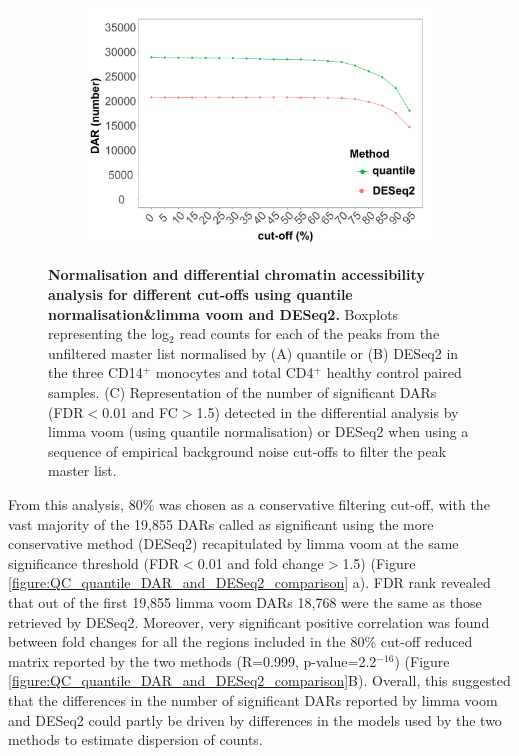 \begin{figure}[htbp]
\begin{subfigure}{0.5\textwidth}
\includegraphics[width=\textwidth]{./Results1/pdfs/ATAC_Core_CD4vsCD14_DOC_FDR_01_vs_cutoffs_quantile_DESeq2_only}
\caption{\textbf{}}
\end{subfigure}

\caption[Normalisation and differential chromatin accessibility analysis for different cut-offs using quantile normalisation limma voom and DESeq2.]{\textbf{Normalisation and differential chromatin accessibility analysis for different cut-offs using quantile normalisation\&limma voom and DESeq2.} Boxplots representing the log$_2$  read counts for each of the peaks from the unfiltered master list normalised by (A) quantile or (B) DESeq2 in the three CD14$^+$ monocytes and total CD4$^+$  healthy control paired samples. (C) Representation of the number of significant DARs (FDR$<$0.01 and FC$>$1.5) detected in the differential analysis by limma voom (using quantile normalisation) or DESeq2 when using a sequence of empirical background noise cut-offs to filter the peak master list.}
\label{figure:ATAC_normalisation_and_DARs_limma_DESeq2}
\end{figure} 


From this analysis, 80\% was chosen as a conservative filtering cut-off, with the vast majority of the 19,855  DARs called as significant using the more conservative method (DESeq2) recapitulated by limma voom at the same significance threshold (FDR$<$0.01 and fold change$>$1.5) (Figure \ref{figure:QC_quantile_DAR_and_DESeq2_comparison} a). FDR rank revealed that out of the first 19,855 limma voom DARs 18,768 were the same as those retrieved by DESeq2. Moreover, very significant positive correlation was found between fold changes for all the regions included in the 80\% cut-off reduced matrix reported by the two methods (R=0.999, p-value=2.2$^{-16}$) (Figure \ref{figure:QC_quantile_DAR_and_DESeq2_comparison}B). Overall, this suggested that the differences in the number of significant DARs reported by limma voom and DESeq2 could partly be driven by differences in the models used by the two methods to estimate dispersion of counts. 



